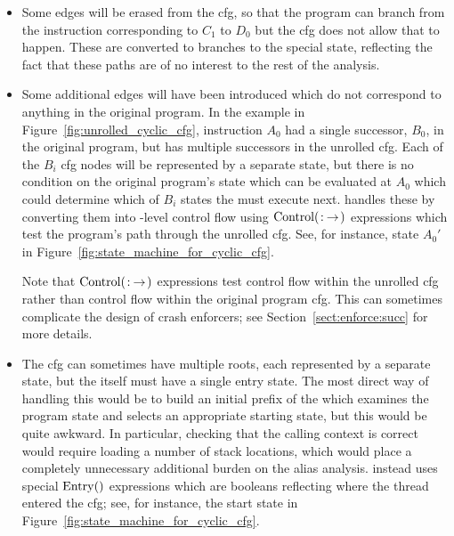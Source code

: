 \begin{itemize}
\item
  Some edges will be erased from the \gls{cfg}, so that the
  program can branch from the instruction corresponding to $C_1$ to
  $D_0$ but the \gls{cfg} does not allow that to happen.  These
  are converted to branches to the special {\stUnreached} state,
  reflecting the fact that these paths are of no interest to the rest
  of the analysis.

\item
  Some additional edges will have been introduced which do not
  correspond to anything in the original program.  In the example in
  Figure~\ref{fig:unrolled_cyclic_cfg}, instruction $A_0$ had a single
  successor, $B_0$, in the original program, but has multiple
  successors in the unrolled \gls{cfg}.  Each of the $B_i$
  \gls{cfg} nodes will be represented by a separate
  {\StateMachine} state, but there is no condition on the
  original program's state which can be evaluated at $A_0$
  which could determine which of $B_i$ states the
  {\StateMachine} must execute next.  {\Technique} handles
  these by converting them into \StateMachine-level control
  flow using $\mathrm{Control}(\mathrm{}\!:\!\mathrm{}\!\rightarrow\!\mathrm{})$ expressions which test the
  program's path through the unrolled \gls{cfg}.  See, for
  instance, state $A_0'$ in
  Figure~\ref{fig:state_machine_for_cyclic_cfg}.

  Note that $\mathrm{Control}(\mathrm{}\!:\!\mathrm{}\!\rightarrow\!\mathrm{})$ expressions test control flow within
  the unrolled \gls{cfg} rather than control flow within the
  original program \gls{cfg}.  This can sometimes complicate the design of
  crash enforcers; see Section~\ref{sect:enforce:succ} for more
  details.

\item
  The \gls{cfg} can sometimes have multiple roots, each
  represented by a separate {\StateMachine} state, but the
  {\StateMachine} itself must have a single entry state.  The most
  direct way of handling this would be to build an initial prefix of
  the {\StateMachine} which examines the program state and selects an
  appropriate starting state, but this would be quite awkward.  In
  particular, checking that the calling context is correct would
  require loading a number of stack locations, which would place a
  completely unnecessary additional burden on the alias analysis.
  {\Technique} instead uses special $\mathrm{Entry}()$ expressions which
  are booleans reflecting where the thread entered the \gls{cfg}; see, for
  instance, the start state in
  Figure~\ref{fig:state_machine_for_cyclic_cfg}.

\end{itemize}

